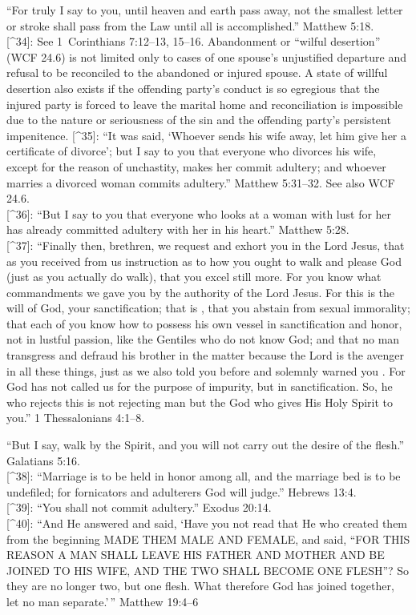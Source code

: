 \documentclass[
]{book}
\begin{document}
``For truly I say to you, until heaven and earth pass away, not the smallest letter or stroke shall pass from the Law until all is accomplished.'' Matthew 5:18.\\
{[}\^{}34{]}: See 1~Corinthians 7:12--13, 15--16. Abandonment or ``wilful desertion'' (WCF 24.6) is not limited only to cases of one spouse's unjustified departure and refusal to be reconciled to the abandoned or injured spouse. A state of willful desertion also exists if the offending party's conduct is so egregious that the injured party is forced to leave the marital home and reconciliation is impossible due to the nature or seriousness of the sin and the offending party's persistent impenitence.
{[}\^{}35{]}: ``It was said, `Whoever sends his wife away, let him give her a certificate of divorce'; but I say to you that everyone who divorces his wife, except for the reason of unchastity, makes her commit adultery; and whoever marries a divorced woman commits adultery.'' Matthew 5:31--32. See also WCF 24.6.\\
{[}\^{}36{]}: ``But I say to you that everyone who looks at a woman with lust for her has already committed adultery with her in his heart.'' Matthew 5:28.\\
{[}\^{}37{]}: ``Finally then, brethren, we request and exhort you in the Lord Jesus, that as you received from us instruction as to how you ought to walk and please God (just as you actually do walk), that you excel still more. For you know what commandments we gave you by the authority of the Lord Jesus. For this is the will of God, your sanctification; that is , that you abstain from sexual immorality; that each of you know how to possess his own vessel in sanctification and honor, not in lustful passion, like the Gentiles who do not know God; and that no man transgress and defraud his brother in the matter because the Lord is the avenger in all these things, just as we also told you before and solemnly warned you . For God has not called us for the purpose of impurity, but in sanctification. So, he who rejects this is not rejecting man but the God who gives His Holy Spirit to you.'' 1 Thessalonians 4:1--8.

``But I say, walk by the Spirit, and you will not carry out the desire of the flesh.'' Galatians 5:16.\\
{[}\^{}38{]}: ``Marriage is to be held in honor among all, and the marriage bed is to be undefiled; for fornicators and adulterers God will judge.'' Hebrews 13:4.\\
{[}\^{}39{]}: ``You shall not commit adultery.'' Exodus 20:14.\\
{[}\^{}40{]}: ``And He answered and said, `Have you not read that He who created them from the beginning MADE THEM MALE AND FEMALE, and said, ``FOR THIS REASON A MAN SHALL LEAVE HIS FATHER AND MOTHER AND BE JOINED TO HIS WIFE, AND THE TWO SHALL BECOME ONE FLESH''? So they are no longer two, but one flesh. What therefore God has joined together, let no man separate.'\,'' Matthew 19:4--6
\end{document}
